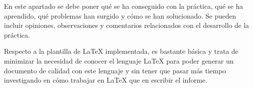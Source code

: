 \documentclass[../../main.tex]{subfile}
\begin{document}
  En este apartado se debe poner qué se ha conseguido con la práctica, qué se ha aprendido, qué problemas han surgido y cómo se han solucionado. Se pueden incluir opiniones, observaciones y comentarios relacionados con el desarrollo de la práctica.

  Respecto a la plantilla de LaTeX implementada, es bastante básica y trata de minimizar la necesidad de conocer el lenguaje LaTeX para poder generar un documento de calidad con este lenguaje y sin tener que pasar más tiempo investigando en cómo trabajar en LaTeX que en escribir el informe.
\end{document}
